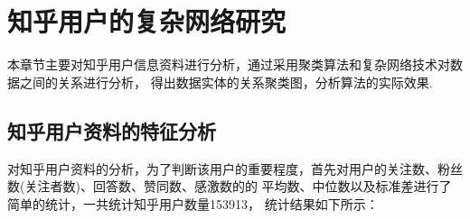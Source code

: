 \documentclass[bachelor,adobefonts]{jnuthesis}
\begin{document}


\chapter{知乎用户的复杂网络研究}
本章节主要对知乎用户信息资料进行分析，通过采用聚类算法和复杂网络技术对数据之间的关系进行分析，
得出数据实体的关系聚类图，分析算法的实际效果.
\section{知乎用户资料的特征分析}
对知乎用户资料的分析，为了判断该用户的重要程度，首先对用户的关注数、粉丝数(关注者数)、回答数、赞同数、感激数的的
平均数、中位数以及标准差进行了简单的统计，一共统计知乎用户数量153913，
统计结果如下所示：
\end{document}

